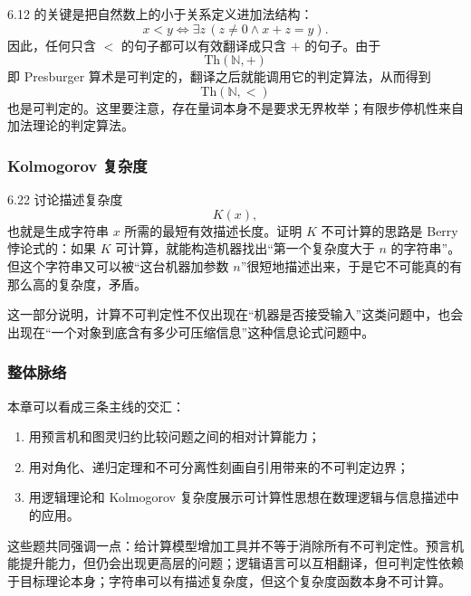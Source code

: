 6.12 的关键是把自然数上的小于关系定义进加法结构：
\[
x<y
\iff
\exists z\,(z\ne 0\wedge x+z=y).
\]
因此，任何只含 $<$ 的句子都可以有效翻译成只含 $+$ 的句子。由于
\[
\mathrm{Th}(\mathbb N,+)
\]
即 Presburger 算术是可判定的，翻译之后就能调用它的判定算法，从而得到
\[
\mathrm{Th}(\mathbb N,<)
\]
也是可判定的。这里要注意，存在量词本身不是要求无界枚举；有限步停机性来自加法理论的判定算法。

\subsubsection*{Kolmogorov 复杂度}

6.22 讨论描述复杂度
\[
K(x),
\]
也就是生成字符串 $x$ 所需的最短有效描述长度。证明 $K$ 不可计算的思路是 Berry 悖论式的：如果 $K$ 可计算，就能构造机器找出“第一个复杂度大于 $n$ 的字符串”。但这个字符串又可以被“这台机器加参数 $n$”很短地描述出来，于是它不可能真的有那么高的复杂度，矛盾。

这一部分说明，计算不可判定性不仅出现在“机器是否接受输入”这类问题中，也会出现在“一个对象到底含有多少可压缩信息”这种信息论式问题中。

\subsubsection*{整体脉络}

本章可以看成三条主线的交汇：
\begin{enumerate}[label=(\arabic*), leftmargin=2.5em]
  \item 用预言机和图灵归约比较问题之间的相对计算能力；
  \item 用对角化、递归定理和不可分离性刻画自引用带来的不可判定边界；
  \item 用逻辑理论和 Kolmogorov 复杂度展示可计算性思想在数理逻辑与信息描述中的应用。
\end{enumerate}

这些题共同强调一点：给计算模型增加工具并不等于消除所有不可判定性。预言机能提升能力，但仍会出现更高层的问题；逻辑语言可以互相翻译，但可判定性依赖于目标理论本身；字符串可以有描述复杂度，但这个复杂度函数本身不可计算。

\clearpage
